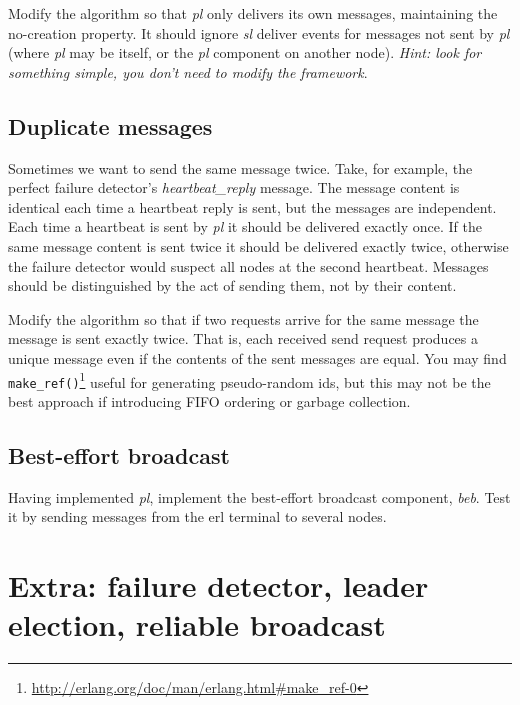 \documentclass[a4paper]{article}
\begin{document}
Modify the algorithm so that \emph{pl} only delivers its own messages, maintaining
the no-creation property. It should ignore \emph{sl} deliver events for messages not
sent by \emph{pl} (where \emph{pl} may be itself, or the \emph{pl} component
on another node). \emph{Hint: look for something simple, you don't need to
modify the framework}.


\subsection{Duplicate messages} %
\label{ssub:duplicate_messages}

Sometimes we want to send the same message twice. Take, for example, the
perfect failure detector's \emph{heartbeat\_reply} message. The message
content is identical each time a heartbeat reply is sent, but the messages are
independent. Each time a heartbeat is sent by \emph{pl} it should be delivered
exactly once. If the same message content is sent twice it should be
delivered exactly twice, otherwise the failure detector would suspect all nodes at
the second heartbeat. Messages should be distinguished by the act of sending
them, not by their content.

Modify the algorithm so that if two requests arrive for the same message
the message is sent exactly twice. That is, each received send request
produces a unique message even if the contents of the sent messages are equal.
You may find
\verb!make_ref()!\footnote{\url{http://erlang.org/doc/man/erlang.html\#make_ref-0}}
useful for generating pseudo-random ids, but this may not be the best approach
if introducing FIFO ordering or garbage collection.



\subsection{Best-effort broadcast} %
\label{sub:best_effort_broadcast}

Having implemented \emph{pl}, implement the best-effort broadcast component,
\emph{beb}. Test it by sending messages from the erl terminal to several
nodes.






\section{Extra: failure detector, leader election, reliable broadcast} %
\label{sub:further_work}
\end{document}

